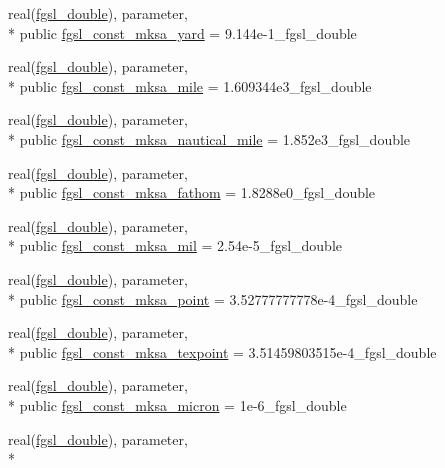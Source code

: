 \begin{DoxyCompactItemize}
real(\hyperlink{classfgsl_a9af5113378e0f000eb479d3f90196ddf}{fgsl\-\_\-double}), parameter, \\*
public \hyperlink{classfgsl_a822a621129f787917e82b140d0814b72}{fgsl\-\_\-const\-\_\-mksa\-\_\-yard} = 9.\-144e-\/1\-\_\-fgsl\-\_\-double
\item 
real(\hyperlink{classfgsl_a9af5113378e0f000eb479d3f90196ddf}{fgsl\-\_\-double}), parameter, \\*
public \hyperlink{classfgsl_a6336ad4316ac012f6ae1ba2c951ec520}{fgsl\-\_\-const\-\_\-mksa\-\_\-mile} = 1.\-609344e3\-\_\-fgsl\-\_\-double
\item 
real(\hyperlink{classfgsl_a9af5113378e0f000eb479d3f90196ddf}{fgsl\-\_\-double}), parameter, \\*
public \hyperlink{classfgsl_a035a322332ff494af9c3ecfb5dca6125}{fgsl\-\_\-const\-\_\-mksa\-\_\-nautical\-\_\-mile} = 1.\-852e3\-\_\-fgsl\-\_\-double
\item 
real(\hyperlink{classfgsl_a9af5113378e0f000eb479d3f90196ddf}{fgsl\-\_\-double}), parameter, \\*
public \hyperlink{classfgsl_a1b3e809c97882aeaebf2e325079f38a3}{fgsl\-\_\-const\-\_\-mksa\-\_\-fathom} = 1.\-8288e0\-\_\-fgsl\-\_\-double
\item 
real(\hyperlink{classfgsl_a9af5113378e0f000eb479d3f90196ddf}{fgsl\-\_\-double}), parameter, \\*
public \hyperlink{classfgsl_af6a9d8baf161c3f9b2b9c8ef41833a67}{fgsl\-\_\-const\-\_\-mksa\-\_\-mil} = 2.\-54e-\/5\-\_\-fgsl\-\_\-double
\item 
real(\hyperlink{classfgsl_a9af5113378e0f000eb479d3f90196ddf}{fgsl\-\_\-double}), parameter, \\*
public \hyperlink{classfgsl_ad8f1c0644b869b25114ce66526bd4a9d}{fgsl\-\_\-const\-\_\-mksa\-\_\-point} = 3.\-52777777778e-\/4\-\_\-fgsl\-\_\-double
\item 
real(\hyperlink{classfgsl_a9af5113378e0f000eb479d3f90196ddf}{fgsl\-\_\-double}), parameter, \\*
public \hyperlink{classfgsl_a962d8da1f8bc62c2323777660898e316}{fgsl\-\_\-const\-\_\-mksa\-\_\-texpoint} = 3.\-51459803515e-\/4\-\_\-fgsl\-\_\-double
\item 
real(\hyperlink{classfgsl_a9af5113378e0f000eb479d3f90196ddf}{fgsl\-\_\-double}), parameter, \\*
public \hyperlink{classfgsl_ab0be2229dca10e5128f21a8729ff742b}{fgsl\-\_\-const\-\_\-mksa\-\_\-micron} = 1e-\/6\-\_\-fgsl\-\_\-double
\item 
real(\hyperlink{classfgsl_a9af5113378e0f000eb479d3f90196ddf}{fgsl\-\_\-double}), parameter, \\*

\end{DoxyCompactItemize}
